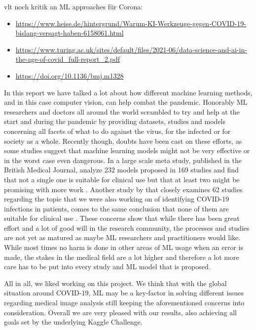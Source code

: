 vlt noch kritik an ML approaches für Corona:
 \begin{itemize}
 	\item \url{https://www.heise.de/hintergrund/Warum-KI-Werkzeuge-gegen-COVID-19-bislang-versagt-haben-6158061.html}
 	\item \url{https://www.turing.ac.uk/sites/default/files/2021-06/data-science-and-ai-in-the-age-of-covid_full-report_2.pdf}
 	\item \url{https://doi.org/10.1136/bmj.m1328}
 \end{itemize}

In this report we have talked a lot about how different machine learning methods, and in this case computer vision, can help combat the pandemic. Honorably ML researchers and doctors all around the world scrambled to try and help at the start and during the pandemic by providing datasets, studies and models concerning all facets of what to do against the virus, for the infected or for society as a whole. Recently though, doubts have been cast on these efforts, as some studies suggest that machine learning models might not be very effective or in the worst case even dangerous. In a large scale meta study, published in the British Medical Journal, \citeauthor{wynants_prediction_2020} analyze 232 models proposed in 169 studies and find that not a single one is suitable for clinical use but that at least two might be promising with more work \autocite{wynants_prediction_2020}. Another study by \citeauthor{aix-covnet_common_2021} that closely examines 62 studies regarding the topic that we were also working on of identifying COVID-19 infections in patients, comes to the same conclusion that none of them are suitable for clinical use \autocite{aix-covnet_common_2021}. These concerns show that while there has been great effort and a lot of good will in the research community, the processes and studies are not yet as matured as maybe ML researchers and practitioners would like. While most times no harm is done in other areas of ML usage when an error is made, the stakes in the medical field are a lot higher and therefore a lot more care has to be put into every study and ML model that is proposed.

All in all, we liked working on this project. We think that with the global situation around COVID-19, ML may be a key-factor in solving different issues regarding medical image analysis still keeping the aforementioned concerns into consideration. Overall we are very pleased with our results, also achieving all goals set by the underlying Kaggle Challenge.
